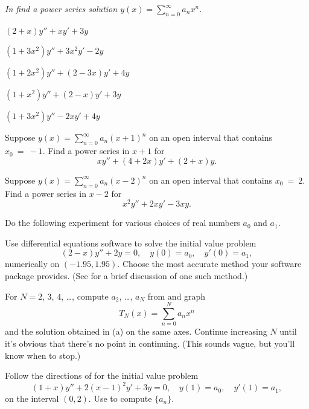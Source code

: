 %
\textsl{In 
find a power series solution
$y(x)=\sum_{n=0}^\infty a_nx^n$.}
\begin{exerciselistTwoColumn}
\item\label{exer:7.1.11}$(2+x)y''+xy'+3y$
\item\label{exer:7.1.12}$(1+3x^2)y''+3x^2y'-2y$
\item\label{exer:7.1.13}$(1+2x^2)y''+(2-3x)y'+4y$
\item\label{exer:7.1.14}$(1+x^2)y''+(2-x)y'+3y$
\item\label{exer:7.1.15}$(1+3x^2)y''-2xy'+4y$
\end{exerciselistTwoColumn}

\begin{exerciselist}
\item\label{exer:7.1.16}Suppose $y(x)=\sum_{n=0}^\infty a_n(x+1)^n$
on an open interval that contains $x_0~=~-1$. Find a power series in
$x+1$ for
\[
xy''+(4+2x)y'+(2+x)y.
\]

\item\label{exer:7.1.17}Suppose $y(x)=\sum_{n=0}^\infty
a_n(x-2)^n$ on an open interval  that contains $x_0~=~2$.
Find a power series in $x-2$ for
\[
x^2y''+2xy'-3xy.
\]


\item\label{exer:7.1.18}\Lex
Do the following experiment for various choices of
real numbers  $a_0$ and $a_1$.
\begin{alist}
\item %
Use  differential equations software  to solve the initial
value problem
\[
(2-x)y''+2y=0,\quad y(0)=a_0,\quad y'(0)=a_1,
\]
numerically on $(-1.95,1.95)$. Choose the most accurate method
your software package provides.
(See  for a brief discussion of one such
method.)
\item %
For $N=2$, $3$, $4$, \dots, compute $a_2$, \dots, $a_N$
from  and graph
\[
T_N(x)=\sum_{n=0}^N a_nx^n
\]
and the solution obtained in (a) on the same axes.
Continue increasing $N$ until it's obvious that there's
no point in continuing.
(This sounds vague, but you'll know when to stop.)
\end{alist}

\item\label{exer:7.1.19}\Lex
Follow the directions of  for the initial
value problem
\[
(1+x)y''+2(x-1)^2y'+3y=0,\quad y(1)=a_0,\quad y'(1)=a_1,
\]
on the interval $(0,2)$. Use 
to compute $\{a_n\}$.


\end{exerciselist}

